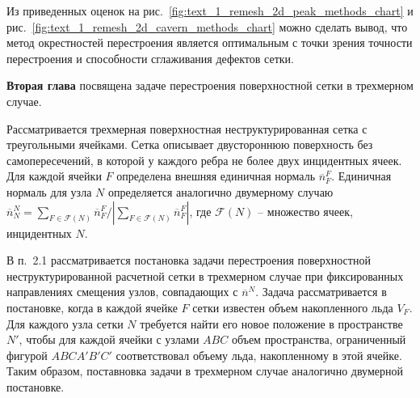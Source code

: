 \documentclass[a4paper,14pt]{extarticle}                     %
\theoremstyle{plain}                                         %
\begin{document}
Из приведенных оценок на рис.~\ref{fig:text_1_remesh_2d_peak_methods_chart} и рис.~\ref{fig:text_1_remesh_2d_cavern_methods_chart} можно сделать вывод, что метод окрестностей перестроения является оптимальным с точки зрения точности перестроения и способности сглаживания дефектов сетки.


\newpage
\textbf{Вторая глава} посвящена задаче перестроения поверхностной сетки в трехмерном случае.

Рассматривается трехмерная поверхностная неструктурированная сетка с треугольными ячейками.
Сетка описывает двустороннюю поверхность без самопересечений, в которой у каждого ребра не более двух инцидентных ячеек.
Для каждой ячейки $F$ определена внешняя единичная нормаль $\overline{n}_F^F$.
Единичная нормаль для узла $N$ определяется аналогично двумерному случаю $\overline{n}_N^N = \sum_{F \in \mathscr{F}(N)}{\overline{n}_F^F} / |\sum_{F \in \mathscr{F}(N)}{\overline{n}_F^F}|$, где $\mathscr{F}(N)$ -- множество ячеек, инцидентных $N$.


В п.~2.1 рассматривается постановка задачи перестроения поверхностной неструктурированной расчетной сетки в трехмерном случае при фиксированных направлениях смещения узлов, совпадающих с $\overline{n}^N$.
Задача рассматривается в постановке, когда в каждой ячейке $F$ сетки известен объем накопленного льда $V_F$.
Для каждого узла сетки $N$ требуется найти его новое положение в пространстве $N'$, чтобы для каждой ячейки с узлами $ABC$ объем пространства, ограниченный фигурой $ABCA'B'C'$ соответствовал объему льда, накопленному в этой ячейке.
Таким образом, поставновка задачи в трехмерном случае аналогично двумерной постановке.
\end{document}

